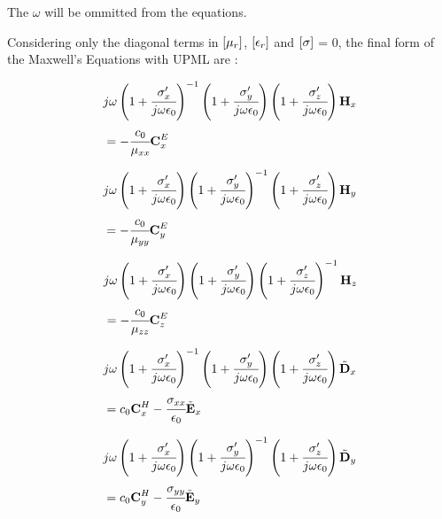 The $\omega$ will be ommitted from the equations.

Considering only the diagonal terms in $\brackets{\mu_r}$, $\brackets{\epsilon_r}$ and $\brackets{\sigma}$ = 0, the final form of the Maxwell's Equations with UPML are \cite{empossible_3d_pml}:

\begin{small}

    \begin{align}
        &j\omega\pare{1 + \cfrac{\sigma_x\Prime}{j\omega\epsilon_0}}\inverse \pare{1 + \cfrac{\sigma_y\Prime}{j\omega\epsilon_0}}\pare{1 + \cfrac{\sigma_z\Prime}{j\omega\epsilon_0}} \Hh_x \nonumber \\
        &= -\cfrac{c_0}{\mu_{xx}}\CExw
        \label{eq:Hx_upml_freq}
    \end{align}

    \begin{align}
        &j\omega\pare{1 + \cfrac{\sigma_x\Prime}{j\omega\epsilon_0}} \pare{1 + \cfrac{\sigma_y\Prime}{j\omega\epsilon_0}}\inverse\pare{1 + \cfrac{\sigma_z\Prime}{j\omega\epsilon_0}} \Hh_y \nonumber \\
        &= -\cfrac{c_0}{\mu_{yy}}\CEyw
        \label{eq:Hy_upml_freq}
    \end{align}

    \begin{align}
        &j\omega\pare{1 + \cfrac{\sigma_x\Prime}{j\omega\epsilon_0}} \pare{1 + \cfrac{\sigma_y\Prime}{j\omega\epsilon_0}}\pare{1 + \cfrac{\sigma_z\Prime}{j\omega\epsilon_0}}\inverse \Hh_z \nonumber \\
        &= -\cfrac{c_0}{\mu_{zz}}\CEzw
        \label{eq:Hz_upml_freq}
    \end{align}

    \begin{align}
        &j\omega\pare{1 + \cfrac{\sigma_x\Prime}{j\omega\epsilon_0}}\inverse \pare{1 + \cfrac{\sigma_y\Prime}{j\omega\epsilon_0}}\pare{1 + \cfrac{\sigma_z\Prime}{j\omega\epsilon_0}} \Dnw_x \nonumber \\
        &= c_0\CHxw - \cfrac{\sigma_{xx}}{\epsilon_0}\Enw_x
        \label{eq:Ex_upml_freq}
    \end{align}

    \begin{align}
        &j\omega\pare{1 + \cfrac{\sigma_x\Prime}{j\omega\epsilon_0}} \pare{1 + \cfrac{\sigma_y\Prime}{j\omega\epsilon_0}}\inverse \pare{1 + \cfrac{\sigma_z\Prime}{j\omega\epsilon_0}} \Dnw_y \nonumber \\
        &= c_0\CHyw - \cfrac{\sigma_{yy}}{\epsilon_0}\Enw_y
        \label{eq:Ey_upml_freq}
    \end{align}


\end{small}
